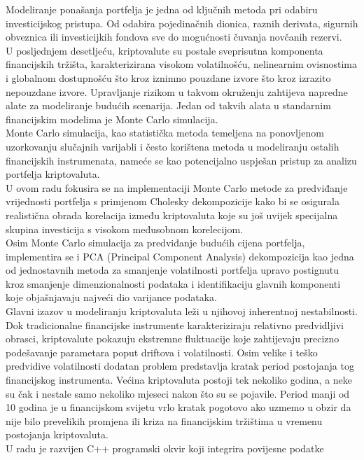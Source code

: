 \documentclass[zavrsnirad]{fer}
\begin{document}
Modeliranje ponašanja portfelja je jedna od ključnih metoda pri odabiru
investicijskog pristupa. Od odabira pojedinačnih dionica, raznih
derivata, sigurnih obveznica ili investicijkih fondova sve do mogućnosti
čuvanja novčanih rezervi.\\
U posljednjem desetljeću, kriptovalute su postale sveprisutna
komponenta financijskih tržišta, karakterizirana visokom volatilnošću,
nelinearnim ovisnostima i globalnom dostupnošću što kroz iznimno pouzdane izvore
što kroz izrazito nepouzdane izvore.
Upravljanje rizikom u takvom okruženju zahtijeva napredne alate za
modeliranje budućih scenarija.
Jedan od takvih alata u standarnim financijskim modelima je Monte Carlo
simulacija.\\
Monte Carlo simulacija, kao statistička metoda temeljena na ponovljenom
uzorkovanju slučajnih varijabli i često korištena metoda u modeliranju
ostalih financijskih instrumenata, nameće se kao potencijalno uspješan
pristup za analizu portfelja kriptovaluta.\\
U ovom radu fokusira se na implementaciji
Monte Carlo metode za predviđanje vrijednosti portfelja s primjenom
Cholesky dekompozicije kako bi se osigurala realistična obrada
korelacija između kriptovaluta koje su još uvijek specijalna skupina investicija
s visokom međusobnom korelecijom.\\
Osim Monte Carlo simulacija za predviđanje budućih cijena portfelja,
implementira se i PCA (Principal Component Analysis) dekompozicija
kao jedna od jednostavnih metoda za smanjenje volatilnosti portfelja
upravo postignutu kroz smanjenje dimenzionalnosti podataka i identifikaciju
glavnih komponenti koje objašnjavaju najveći dio varijance podataka.\\
Glavni izazov u modeliranju kriptovaluta leži u njihovoj inherentnoj
nestabilnosti. Dok tradicionalne financijske instrumente karakteriziraju
relativno predvidljivi obrasci, kriptovalute pokazuju ekstremne fluktuacije
koje zahtijevaju precizno podešavanje parametara poput driftova i
volatilnosti. Osim velike i teško predvidive volatilnosti dodatan problem
predstavlja kratak period postojanja tog financijskog instrumenta.
Većina kriptovaluta postoji tek nekoliko godina, a neke su čak i
nestale samo nekoliko mjeseci nakon što su se pojavile. Period manji od
10 godina je u financijskom svijetu vrlo kratak pogotovo ako uzmemo u obzir
da nije bilo prevelikih promjena ili kriza na financijskim tržištima
u vremenu postojanja kriptovaluta.\\
U radu je razvijen C++ programski okvir koji integrira povijesne podatke
\end{document}
